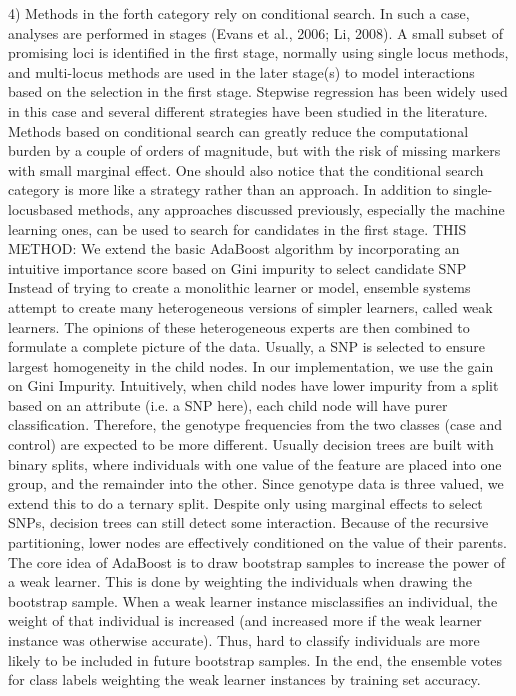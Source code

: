 	4) Methods in the forth category rely on conditional search. In such a case, analyses are performed in stages (Evans et al., 2006; Li, 2008). A small subset of promising loci is identified in the first stage, normally using single locus methods, and multi-locus methods are used in the later stage(s) to model interactions based on the selection in the first stage. Stepwise regression has been widely used in this case and several different strategies have been studied in the literature. Methods based on conditional search can greatly reduce the computational burden by a couple of orders of magnitude, but with the risk of missing markers with small marginal effect. One should also notice that the conditional search category is more like a strategy rather than an approach. In addition to single-locusbased methods, any approaches discussed previously, especially the machine learning ones, can be used to search for candidates in the first stage. \cite{li2011detecting}
THIS METHOD: We extend the basic AdaBoost algorithm by incorporating an intuitive importance score based on Gini impurity to select candidate SNP \cite{li2011detecting}
Instead of trying to create a monolithic learner or model, ensemble systems attempt to create many heterogeneous versions of simpler learners, called weak learners. The opinions of these heterogeneous experts are then combined to formulate a complete picture of the data.  \cite{li2011detecting}
Usually, a SNP is selected to ensure largest homogeneity in the child nodes. In our implementation, we use the gain on Gini Impurity. Intuitively, when child nodes have lower impurity from a split based on an attribute (i.e. a SNP here), each child node will have purer classification. Therefore, the genotype frequencies from the two classes (case and control) are expected to be more different.  \cite{li2011detecting}
Usually decision trees are built with binary splits, where individuals with one value of the feature are placed into one group, and the remainder into the other. Since genotype data is three valued, we extend this to do a ternary split. \cite{li2011detecting}
Despite only using marginal effects to select SNPs, decision trees can still detect some interaction. Because of the recursive partitioning, lower nodes are effectively conditioned on the value of their parents.
The core idea of AdaBoost is to draw bootstrap samples to increase the power of a weak learner. This is done by weighting the individuals when drawing the bootstrap sample. When a weak learner instance misclassifies an individual, the weight of that individual is increased (and increased more if the weak learner instance was otherwise accurate). Thus, hard to classify individuals are more likely to be included in future bootstrap samples. In the end, the ensemble votes for class labels weighting the weak learner instances by training set accuracy.  \cite{li2011detecting}

